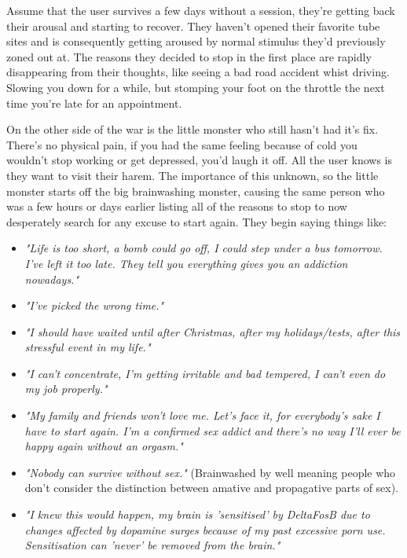 \documentclass[easypeasy.tex]{subfiles}
\begin{document}
Assume that the user survives a few days without a session, they're getting back their arousal and starting to recover. They haven't opened their favorite tube sites and is consequently getting aroused by normal stimulus they'd previously zoned out at. The reasons they decided to stop in the first place are rapidly disappearing from their thoughts, like seeing a bad road accident whist driving. Slowing you down for a while, but stomping your foot on the throttle the next time you're late for an appointment.

On the other side of the war is the little monster who still hasn't had it's fix. There's no physical pain, if you had the same feeling because of cold you wouldn't stop working or get depressed, you'd laugh it off. All the user knows is they want to visit their harem. The importance of this unknown, so the little monster starts off the big brainwashing monster, causing the same person who was a few hours or days earlier listing all of the reasons to stop to now desperately search for any excuse to start again. They begin saying things like:
\begin{itemize}

  \item \textit{"Life is too short, a bomb could go off, I could step under a bus tomorrow. I've left it too late. They tell you everything gives you an addiction nowadays."}

  \item \textit{"I've picked the wrong time."}

  \item \textit{"I should have waited until after Christmas, after my holidays/tests, after this stressful event in my life."}

  \item \textit{"I can't concentrate, I'm getting irritable and bad tempered, I can't even do my job properly."}

  \item \textit{"My family and friends won't love me. Let's face it, for everybody's sake I have to start again. I'm a confirmed sex addict and there's no way I'll ever be happy again without an orgasm."}

  \item \textit{"Nobody can survive without sex."} (Brainwashed by well meaning people who don't consider the distinction between amative and propagative parts of sex).

  \item \textit{"I knew this would happen, my brain is 'sensitised' by DeltaFosB due to changes affected by dopamine surges because of my past excessive porn use. Sensitisation can 'never' be removed from the brain."}
\end{itemize}
\end{document}
